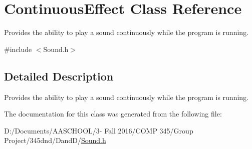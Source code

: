 \hypertarget{class_continuous_effect}{}\section{Continuous\+Effect Class Reference}
\label{class_continuous_effect}


Provides the ability to play a sound continuously while the program is running.  




{\ttfamily \#include $<$Sound.\+h$>$}



\subsection{Detailed Description}
Provides the ability to play a sound continuously while the program is running. 

The documentation for this class was generated from the following file\+:\begin{DoxyCompactItemize}
\item 
D\+:/\+Documents/\+A\+A\+S\+C\+H\+O\+O\+L/3-\/ Fall 2016/\+C\+O\+M\+P 345/\+Group Project/345dnd/\+Dand\+D/\hyperlink{_sound_8h}{Sound.\+h}\end{DoxyCompactItemize}
